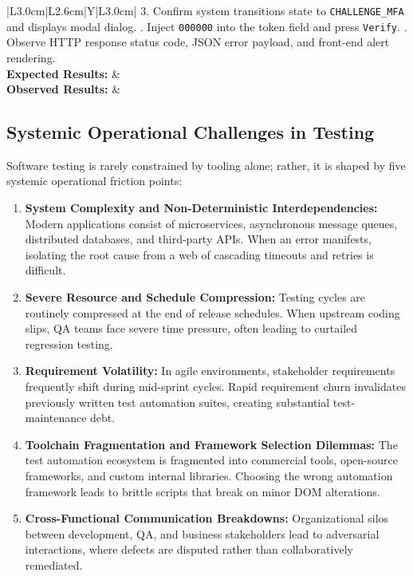 \documentclass[11pt,a4paper]{article}
\begin{document}
\begin{table}[htbp]
\begin{tabularx}{\textwidth}{|L{3.0cm}|L{2.6cm}|Y|L{3.0cm}|}
{3. Confirm system transitions state to \texttt{CHALLENGE\_MFA} and displays modal dialog. . Inject \texttt{000000} into the token field and press \texttt{Verify}. . Observe HTTP response status code, JSON error payload, and front-end alert rendering.} \\
\hline
\textbf{Expected Results:} &  \\
\hline
\textbf{Observed Results:} &  \\
\hline
\end{tabularx}
\caption{Production-Grade Standardized Test Plan Artifact Specimen.}
\label{tab:test_plan_specimen}
\end{table}

\subsection{Systemic Operational Challenges in Testing}
Software testing is rarely constrained by tooling alone; rather, it is shaped by five systemic operational friction points:
\begin{enumerate}
    \item \textbf{System Complexity and Non-Deterministic Interdependencies:} Modern applications consist of microservices, asynchronous message queues, distributed databases, and third-party APIs. When an error manifests, isolating the root cause from a web of cascading timeouts and retries is difficult.
    \item \textbf{Severe Resource and Schedule Compression:} Testing cycles are routinely compressed at the end of release schedules. When upstream coding slips, QA teams face severe time pressure, often leading to curtailed regression testing.
    \item \textbf{Requirement Volatility:} In agile environments, stakeholder requirements frequently shift during mid-sprint cycles. Rapid requirement churn invalidates previously written test automation suites, creating substantial test-maintenance debt.
    \item \textbf{Toolchain Fragmentation and Framework Selection Dilemmas:} The test automation ecosystem is fragmented into commercial tools, open-source frameworks, and custom internal libraries. Choosing the wrong automation framework leads to brittle scripts that break on minor DOM alterations.
    \item \textbf{Cross-Functional Communication Breakdowns:} Organizational silos between development, QA, and business stakeholders lead to adversarial interactions, where defects are disputed rather than collaboratively remediated.
\end{enumerate}
\end{document}
